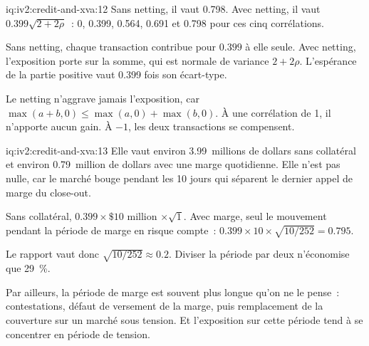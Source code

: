 \begin{solution}{iq:iv2:credit-and-xva:12}
Sans netting, il vaut 0.798. Avec netting, il vaut $0.399\sqrt{2 + 2\rho}$~: 0, 0.399, 0.564, 0.691 et 0.798 pour ces cinq corrélations.

Sans netting, chaque transaction contribue pour $0.399$ à elle seule. Avec netting, l'exposition porte sur la somme, qui est normale de variance $2 + 2\rho$. L'espérance de la partie positive vaut 0.399 fois son écart-type.

Le netting n'aggrave jamais l'exposition, car $\max(a + b, 0) \le \max(a, 0) + \max(b, 0)$. À une corrélation de 1, il n'apporte aucun gain. À $-1$, les deux transactions se compensent.

\end{solution}

\begin{solution}{iq:iv2:credit-and-xva:13}
Elle vaut environ 3.99~millions de dollars sans collatéral et environ 0.79~million de dollars avec une marge quotidienne. Elle n'est pas nulle, car le marché bouge pendant les 10 jours qui séparent le dernier appel de marge du close-out.

Sans collatéral, $0.399 \times \$10$ million $\times \sqrt{1}$. Avec marge, seul le mouvement pendant la période de marge en risque compte~: $0.399 \times 10 \times \sqrt{10/252} = 0.795$.

Le rapport vaut donc $\sqrt{10/252} \approx 0.2$. Diviser la période par deux n'économise que 29~\%.

Par ailleurs, la période de marge est souvent plus longue qu'on ne le pense~: contestations, défaut de versement de la marge, puis remplacement de la couverture sur un marché sous tension. Et l'exposition sur cette période tend à se concentrer en période de tension.

\end{solution}

